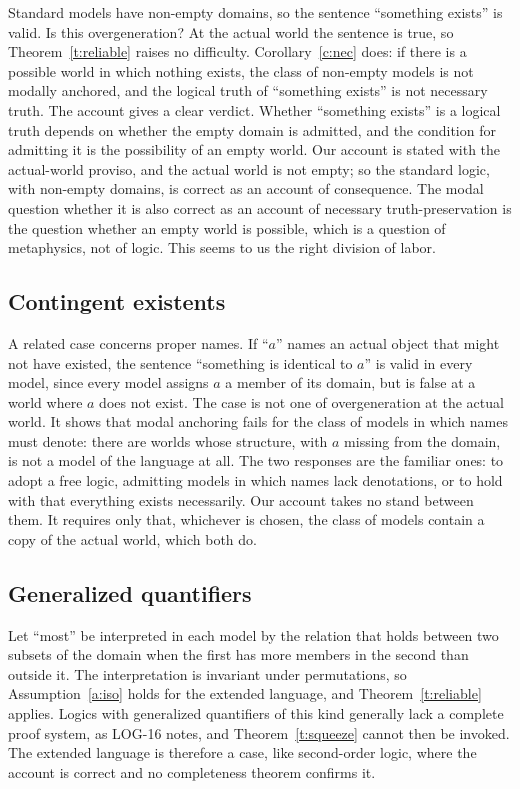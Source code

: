 \documentclass{situationist-preprint}
\begin{document}
Standard models have non-empty domains, so the sentence \enquote{something exists} is valid. Is this overgeneration? At the actual world the sentence is true, so Theorem~\ref{t:reliable} raises no difficulty. Corollary~\ref{c:nec} does: if there is a possible world in which nothing exists, the class of non-empty models is not modally anchored, and the logical truth of \enquote{something exists} is not necessary truth. The account gives a clear verdict. Whether \enquote{something exists} is a logical truth depends on whether the empty domain is admitted, and the condition for admitting it is the possibility of an empty world. Our account is stated with the actual-world proviso, and the actual world is not empty; so the standard logic, with non-empty domains, is correct as an account of consequence. The modal question whether it is also correct as an account of necessary truth-preservation is the question whether an empty world is possible, which is a question of metaphysics, not of logic. This seems to us the right division of labor.

\subsection{Contingent existents}

A related case concerns proper names. If \enquote{$a$} names an actual object that might not have existed, the sentence \enquote{something is identical to $a$} is valid in every model, since every model assigns $a$ a member of its domain, but is false at a world where $a$ does not exist. The case is not one of overgeneration at the actual world. It shows that modal anchoring fails for the class of models in which names must denote: there are worlds whose structure, with $a$ missing from the domain, is not a model of the language at all. The two responses are the familiar ones: to adopt a free logic, admitting models in which names lack denotations, or to hold with \citet{Williamson2013} that everything exists necessarily. Our account takes no stand between them. It requires only that, whichever is chosen, the class of models contain a copy of the actual world, which both do.

\subsection{Generalized quantifiers}

Let \enquote{most} be interpreted in each model by the relation that holds between two subsets of the domain when the first has more members in the second than outside it. The interpretation is invariant under permutations, so Assumption~\ref{a:iso} holds for the extended language, and Theorem~\ref{t:reliable} applies. Logics with generalized quantifiers of this kind generally lack a complete proof system, as LOG-16 notes, and Theorem~\ref{t:squeeze} cannot then be invoked. The extended language is therefore a case, like second-order logic, where the account is correct and no completeness theorem confirms it.
\end{document}
